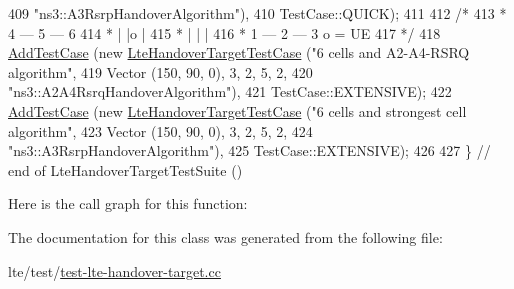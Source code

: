 \begin{DoxyCode}
409                                               \textcolor{stringliteral}{"ns3::A3RsrpHandoverAlgorithm"}),
410                TestCase::QUICK);
411 
412   \textcolor{comment}{/*}
413 \textcolor{comment}{   *    4 --- 5 --- 6}
414 \textcolor{comment}{   *    |     |o    |}
415 \textcolor{comment}{   *    |     |     |}
416 \textcolor{comment}{   *    1 --- 2 --- 3   o = UE}
417 \textcolor{comment}{   */}
418   \hyperlink{classns3_1_1TestCase_a3718088e3eefd5d6454569d2e0ddd835}{AddTestCase} (\textcolor{keyword}{new} \hyperlink{classLteHandoverTargetTestCase}{LteHandoverTargetTestCase} (\textcolor{stringliteral}{"6 cells and A2-A4-RSRQ
       algorithm"},
419                                               Vector (150, 90, 0), 3, 2, 5, 2,
420                                               \textcolor{stringliteral}{"ns3::A2A4RsrqHandoverAlgorithm"}),
421                TestCase::EXTENSIVE);
422   \hyperlink{classns3_1_1TestCase_a3718088e3eefd5d6454569d2e0ddd835}{AddTestCase} (\textcolor{keyword}{new} \hyperlink{classLteHandoverTargetTestCase}{LteHandoverTargetTestCase} (\textcolor{stringliteral}{"6 cells and strongest
       cell algorithm"},
423                                               Vector (150, 90, 0), 3, 2, 5, 2,
424                                               \textcolor{stringliteral}{"ns3::A3RsrpHandoverAlgorithm"}),
425                TestCase::EXTENSIVE);
426 
427 \} \textcolor{comment}{// end of LteHandoverTargetTestSuite ()}
\end{DoxyCode}


Here is the call graph for this function\+:




The documentation for this class was generated from the following file\+:\begin{DoxyCompactItemize}
\item 
lte/test/\hyperlink{test-lte-handover-target_8cc}{test-\/lte-\/handover-\/target.\+cc}\end{DoxyCompactItemize}
